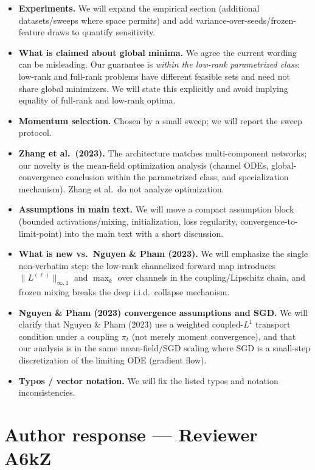 \documentclass[11pt,a4paper]{article}
\newcommand{\NP}{Nguyen \& Pham (2023)}
\begin{document}
\begin{itemize}
  \item \textbf{Experiments.} We will expand the empirical section (additional datasets/sweeps where space permits) and add variance-over-seeds/frozen-feature draws to quantify sensitivity.
  \item \textbf{What is claimed about global minima.} We agree the current wording can be misleading. Our guarantee is \emph{within the low-rank parametrized class}: low-rank and full-rank problems have different feasible sets and need not share global minimizers. We will state this explicitly and avoid implying equality of full-rank and low-rank optima.
  \item \textbf{Momentum selection.} Chosen by a small sweep; we will report the sweep protocol.
  \item \textbf{Zhang et al.\ (2023).} The architecture matches multi-component networks; our novelty is the mean-field optimization analysis (channel ODEs, global-convergence conclusion within the parametrized class, and specialization mechanism). Zhang et al.\ do not analyze optimization.
  \item \textbf{Assumptions in main text.} We will move a compact assumption block (bounded activations/mixing, initialization, loss regularity, convergence-to-limit-point) into the main text with a short discussion.
  \item \textbf{What is new vs.\ \NP{}.} We will emphasize the single non-verbatim step: the low-rank channelized forward map introduces $\|L^{(\ell)}\|_{\infty,1}$ and $\max_k$ over channels in the coupling/Lipschitz chain, and frozen mixing breaks the deep i.i.d.\ collapse mechanism.
  \item \textbf{\NP{} convergence assumptions and SGD.} We will clarify that \NP{} use a weighted coupled-$L^1$ transport condition under a coupling $\pi_t$ (not merely moment convergence), and that our analysis is in the same mean-field/SGD scaling where SGD is a small-step discretization of the limiting ODE (gradient flow).
  \item \textbf{Typos / vector notation.} We will fix the listed typos and notation inconsistencies.
\end{itemize}

\section*{Author response --- Reviewer A6kZ}
\end{document}
